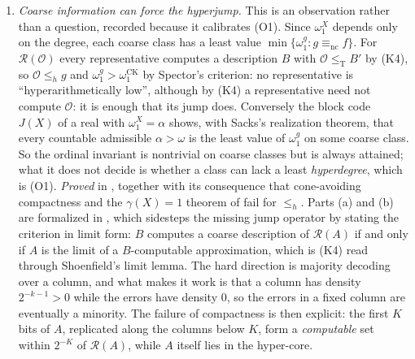 \documentclass[11pt,a4paper]{article}
\newcommand{\R}{\mathcal R}
\newcommand{\leT}{\leq_{\mathrm T}}
\theoremstyle{definition}\newtheorem{definition}[theorem]{Definition}
\theoremstyle{remark}\newtheorem{remark}[theorem]{Remark}
\begin{document}
\begin{enumerate}[label=\textup{(O\arabic*)},leftmargin=3em]
\emph{Whether the category method itself extends to $\le_h$} is question (Q1) of that report, and it is \emph{not} settled there; two routes are ruled out. The Turing proof cannot be repaired, because it runs through the local decoder whose conclusion is the robust-radius characterization, and that is false for $\le_h$. The obvious forcing proof is circular: one can build a pair inside a ball that dodges the closed nowhere dense sets covering the meager complement of the cone, so that both coordinates lie in the cone and the bridge lemma applies, but the ground model must contain the parameters defining those dense sets, and the cone is defined from the avoided set itself; the conclusion is then vacuous. This is the same circularity that makes the classical statement --- a set hyperarithmetic in comeager many reals is hyperarithmetic --- a theorem about $\Sigma^1_1$ sets rather than a genericity argument, and it is the reason (Q1) is harder than its Turing analogue. A transfer from Cantor space is also ruled out: the space of coarse descriptions is nowhere locally compact, so the image of a Cantor-space parametrization is nowhere dense.
\item \emph{Coarse information can force the hyperjump.} This is an observation rather than a question, recorded because it calibrates (O1). Since $\omega_1^X$ depends only on the degree, each coarse class has a least value $\min\{\omega_1^g:g\equiv_{\mathrm{nc}}f\}$. For $\R(\mathcal O)$ every representative computes a description $B$ with $\mathcal O\leT B'$ by (K4), so $\mathcal O\le_h g$ and $\omega_1^g>\omega_1^{\mathrm{CK}}$ by Spector's criterion: no representative is ``hyperarithmetically low'', although by (K4) a representative need not compute $\mathcal O$: it is enough that its jump does. Conversely the block code $J(X)$ of a real with $\omega_1^X=\alpha$ shows, with Sacks's realization theorem, that every countable admissible $\alpha>\omega$ is the least value of $\omega_1^g$ on some coarse class. So the ordinal invariant is nontrivial on coarse classes but is always attained; what it does not decide is whether a class can lack a least \emph{hyperdegree}, which is (O1). \emph{Proved} in \cite[Theorem 1.4]{ReportTen}, together with its consequence that cone-avoiding compactness and the $\gamma(X)=1$ theorem of \cite{HJKS} fail for $\le_h$. Parts (a) and (b) are formalized in , which sidesteps the missing jump operator by stating the criterion in limit form: $B$ computes a coarse description of $\R(A)$ if and only if $A$ is the limit of a $B$-computable approximation, which is (K4) read through Shoenfield's limit lemma. The hard direction is majority decoding over a column, and what makes it work is that a column has density $2^{-k-1}>0$ while the errors have density $0$, so the errors in a fixed column are eventually a minority. The failure of compactness is then explicit: the first $K$ bits of $A$, replicated along the columns below $K$, form a \emph{computable} set within $2^{-K}$ of $\R(A)$, while $A$ itself lies in the hyper-core.

\end{enumerate}
\end{document}
